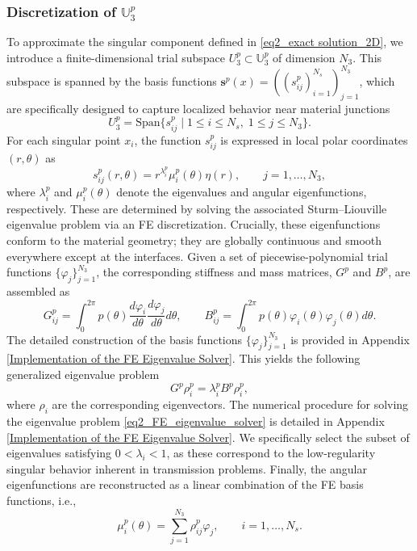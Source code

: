 \documentclass[oneside]{article}
\newcounter{reviewer}
\newcounter{point}[reviewer]
\begin{document}
\subsubsection*{Discretization of $\mathbb{U}^p_3$}
To approximate the singular component defined in \eqref{eq2_exact solution_2D}, we introduce a finite-dimensional trial subspace $U_3^p \subset \mathbb{U}^p_3$ of dimension $N_3$. This subspace is spanned by the basis functions $\mathbf{s}^{p}(x) = ((s_{ij}^p)_{i=1}^{N_s})_{j=1}^{N_3}$, which are specifically designed to capture localized behavior near material junctions
\begin{equation}
U_3^p = \text{Span}\{ s_{ij}^p \mid 1 \le i \le N_s,\; 1 \le j \le N_3 \}.
\end{equation}
For each singular point $x_i$, the function $s_{ij}^p$ is expressed in local polar coordinates $(r, \theta)$ as
\begin{equation}\label{eq2_sjp}
s_{ij}^p(r, \theta) = r^{\lambda_i^p} \mu_i^p(\theta) \eta(r), \qquad j = 1, \ldots, N_3,
\end{equation}
where $\lambda_i^p$ and $\mu_i^p(\theta)$ denote the eigenvalues and angular eigenfunctions, respectively. These are determined by solving the associated Sturm–Liouville eigenvalue problem via an FE discretization. Crucially, these eigenfunctions conform to the material geometry; they are globally continuous and smooth everywhere except at the interfaces. Given a set of piecewise-polynomial trial functions $\{\varphi_j\}_{j=1}^{N_3}$, the corresponding stiffness and mass matrices, $G^p$ and $B^p$, are assembled as
\begin{equation}\label{eq2_FE_matrices}
G^p_{ij} = \int_0^{2\pi} p(\theta) \frac{d \varphi_i}{d\theta} \frac{d \varphi_j}{d\theta} d\theta, \qquad B^p_{ij} = \int_0^{2\pi} p(\theta) \varphi_i(\theta) \varphi_j(\theta) d\theta.
\end{equation}
The detailed construction of the basis functions $\{\varphi_j\}_{j=1}^{N_3}$ is provided in Appendix \eqref{Implementation of the FE Eigenvalue Solver}. This yields the following generalized eigenvalue problem
\begin{equation}\label{eq2_FE_eigenvalue_solver}
G^p \rho_i^p = \lambda_i^p B^p \rho_i^p ,
\end{equation}
where $\rho_i$ are the corresponding eigenvectors. The numerical procedure for solving the eigenvalue problem \eqref{eq2_FE_eigenvalue_solver} is detailed in Appendix \ref{Implementation of the FE Eigenvalue Solver}. We specifically select the subset of eigenvalues satisfying $0 < \lambda_i < 1$, as these correspond to the low-regularity singular behavior inherent in transmission problems. Finally, the angular eigenfunctions are reconstructed as a linear combination of the FE basis functions, i.e.,
\begin{equation}
\mu_i^p(\theta) = \sum_{j=1}^{N_3} \rho_{ij}^p \varphi_j, \qquad i = 1, \ldots, N_s.
\end{equation}
\end{document}
